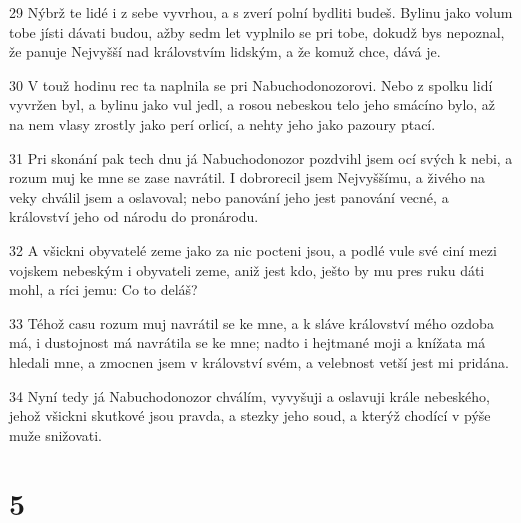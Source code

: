 \par 29 Nýbrž te lidé i z sebe vyvrhou, a s zverí polní bydliti budeš. Bylinu jako volum tobe jísti dávati budou, ažby sedm let vyplnilo se pri tobe, dokudž bys nepoznal, že panuje Nejvyšší nad královstvím lidským, a že komuž chce, dává je.
\par 30 V touž hodinu rec ta naplnila se pri Nabuchodonozorovi. Nebo z spolku lidí vyvržen byl, a bylinu jako vul jedl, a rosou nebeskou telo jeho smácíno bylo, až na nem vlasy zrostly jako perí orlicí, a nehty jeho jako pazoury ptací.
\par 31 Pri skonání pak tech dnu já Nabuchodonozor pozdvihl jsem ocí svých k nebi, a rozum muj ke mne se zase navrátil. I dobrorecil jsem Nejvyššímu, a živého na veky chválil jsem a oslavoval; nebo panování jeho jest panování vecné, a království jeho od národu do pronárodu.
\par 32 A všickni obyvatelé zeme jako za nic pocteni jsou, a podlé vule své ciní mezi vojskem nebeským i obyvateli zeme, aniž jest kdo, ješto by mu pres ruku dáti mohl, a ríci jemu: Co to deláš?
\par 33 Téhož casu rozum muj navrátil se ke mne, a k sláve království mého ozdoba má, i dustojnost má navrátila se ke mne; nadto i hejtmané moji a knížata má hledali mne, a zmocnen jsem v království svém, a velebnost vetší jest mi pridána.
\par 34 Nyní tedy já Nabuchodonozor chválím, vyvyšuji a oslavuji krále nebeského, jehož všickni skutkové jsou pravda, a stezky jeho soud, a kterýž chodící v pýše muže snižovati.

\chapter{5}

